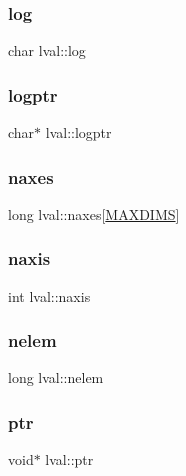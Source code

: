 \subsubsection{\texorpdfstring{log}{log}}
{\footnotesize\ttfamily char lval\+::log}

\mbox{\label{structlval_a557a9410079510e1aa163501e1313283}} 
\subsubsection{\texorpdfstring{logptr}{logptr}}
{\footnotesize\ttfamily char$\ast$ lval\+::logptr}

\mbox{\label{structlval_a86cecd3ad86b481e49a21cf2c75e21fb}} 
\subsubsection{\texorpdfstring{naxes}{naxes}}
{\footnotesize\ttfamily long lval\+::naxes\mbox{[}\hyperlink{eval__defs_8h_a45ed35a158331b8f57fd66c5a18fa835}{M\+A\+X\+D\+I\+MS}\mbox{]}}

\mbox{\label{structlval_a01162544dcb3c44ef01bf40c19f62cca}} 
\subsubsection{\texorpdfstring{naxis}{naxis}}
{\footnotesize\ttfamily int lval\+::naxis}

\mbox{\label{structlval_ab74545461b3676f0c1a6e66835f4ec6a}} 
\subsubsection{\texorpdfstring{nelem}{nelem}}
{\footnotesize\ttfamily long lval\+::nelem}

\mbox{\label{structlval_ad3ff48f2e57781c5d31bef418aa454e0}} 
\subsubsection{\texorpdfstring{ptr}{ptr}}
{\footnotesize\ttfamily void$\ast$ lval\+::ptr}

